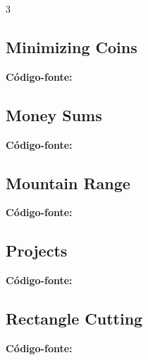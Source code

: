 \documentclass[8pt]{extarticle}
\begin{document}
\begin{multicols*}{3}
\subsection{Minimizing Coins}
\begin{caixaenunciado}

\end{caixaenunciado}
\vspace{0.3cm}
\noindent\textbf{Código-fonte:}


\subsection{Money Sums}
\begin{caixaenunciado}

\end{caixaenunciado}
\vspace{0.3cm}
\noindent\textbf{Código-fonte:}


\subsection{Mountain Range}
\begin{caixaenunciado}

\end{caixaenunciado}
\vspace{0.3cm}
\noindent\textbf{Código-fonte:}


\subsection{Projects}
\begin{caixaenunciado}

\end{caixaenunciado}
\vspace{0.3cm}
\noindent\textbf{Código-fonte:}


\subsection{Rectangle Cutting}
\begin{caixaenunciado}

\end{caixaenunciado}
\vspace{0.3cm}
\noindent\textbf{Código-fonte:}



\end{multicols*}
\end{document}
